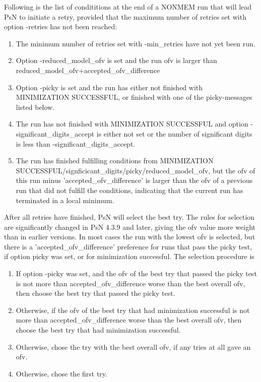 Following is the list of condititions at the end of a NONMEM run that will lead PsN to initiate a retry, provided that 
the maximum number of retries set with option -retries has not been reached:

\begin{enumerate}
\item The minimum number of retries set with -min\_retries have not yet been run.
\item Option -reduced\_model\_ofv is set and the run ofv is larger than reduced\_model\_ofv+accepted\_ofv\_difference
\item Option -picky is set and the run has either not finished with MINIMIZATION SUCCESSFUL, or finished with one of the picky-messages listed below.
\item The run has not finished with MINIMIZATION SUCCESSFUL and option -significant\_digits\_accept is 
either not set or the number of significant digits is less than -significant\_digits\_accept.
\item The run has finished fulfilling conditions from MINIMIZATION SUCCESSFUL/signficicant\_digits/picky/reduced\_model\_ofv, 
but the ofv of this run minus 'accepted\_ofv\_difference' is larger than the ofv of a previous run 
that did not fulfill the conditions, indicating that the current run has terminated in a local minimum.
\end{enumerate}

After all retries have finished, PsN will select the best try. 
The rules for selection are significantly changed in PsN 4.3.9 and later, giving the ofv value more weight than in earlier versions.
In most cases the run with the lowest ofv is selected, but there is a 'accepted\_ofv\_difference' preference for runs
that pass the picky test, if option picky was set, or for minimization successful.
The selection procedure is 
\begin{enumerate}
\item If option -picky was set, and the ofv of the best try that passed the picky test is not more than accepted\_ofv\_difference
worse than the best overall ofv, then choose the best try that passed the picky test. 
\item Otherwise, if the ofv of the best try that had minimization successful is not more than accepted\_ofv\_difference
worse than the best overall ofv, then choose the best try that had minimization successful.
\item Otherwise, chose the try with the best overall ofv, if any tries at all gave an ofv.
\item Otherwise, chose the first try.
\end{enumerate}

